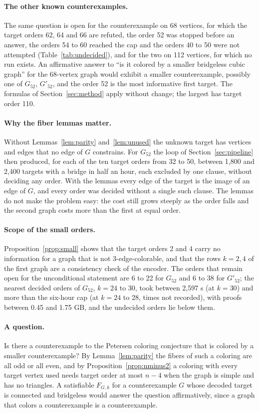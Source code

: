 \documentclass[11pt]{article}
\theoremstyle{definition}
\theoremstyle{remark}
\newcommand{\Ga}{G_{52}}
\newcommand{\Gb}{G'_{52}}
\begin{document}
\paragraph{The other known counterexamples.} The same question is open for the counterexample on 68 vertices, for which the target orders 62, 64 and 66 are refuted, the order 52 was stopped before an answer, the orders 54 to 60 reached the cap and the orders 40 to 50 were not attempted (Table~\ref{tab:undecided}), and for the two on 112 vertices, for which no run exists. An affirmative answer to ``is it colored by a smaller bridgeless cubic graph'' for the
68-vertex graph would exhibit a smaller counterexample, possibly one of $\Ga$, $\Gb$, and the order 52 is the most informative first target. The formulas of Section~\ref{sec:method} apply without change; the largest has target order 110.

\paragraph{Why the fiber lemmas matter.} Without Lemmas~\ref{lem:parity} and~\ref{lem:unused} the unknown target has vertices and edges that no edge of $G$ constrains. For $\Ga$ the loop of Section~\ref{sec:pipeline} then produced, for each of the ten target orders from 32 to 50, between 1{,}800 and 2{,}400 targets with a bridge in half an hour, each excluded by one clause, without deciding any order. With the lemmas every edge of
the target is the image of an edge of $G$, and every order was decided without a single such clause. The lemmas do not make the problem easy: the cost still grows steeply as the order falls and the second graph costs more than the first at equal order.

\paragraph{Scope of the small orders.} Proposition~\ref{prop:small} shows that the target orders 2 and 4 carry no information for a graph that is not 3-edge-colorable, and that the rows $k=2,4$ of the first graph are a consistency check of the encoder. The orders that remain open for the unconditional statement are 6 to 22 for $\Ga$ and 6 to 38 for $\Gb$; the nearest decided orders of $\Ga$, $k = 24$ to 30, took between 2{,}597 s (at $k = 30$) and more than the six-hour cap (at $k = 24$ to 28, times not recorded), with proofs between 0.45 and 1.75 GB, and the undecided orders lie below them.

\paragraph{A question.} Is there a counterexample to the Petersen coloring conjecture that is colored by a smaller counterexample? By Lemma~\ref{lem:parity} the fibers of such a coloring are all odd or all even, and by Proposition~\ref{prop:nminus2} a coloring with every target vertex used needs target order at most $n - 4$ when the graph is simple and has no triangles. A satisfiable $F_{G,k}$ for a counterexample $G$ whose decoded target is connected and bridgeless would answer the question affirmatively, since a graph that colors a counterexample is a counterexample.
\end{document}
